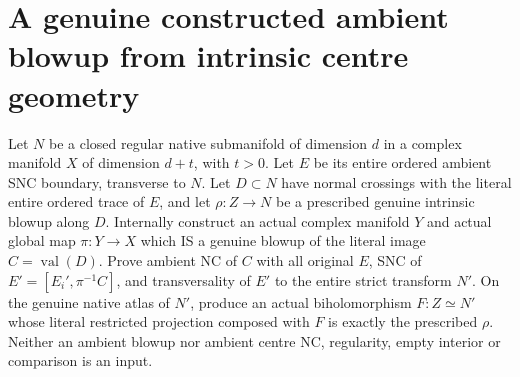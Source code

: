 \section{A genuine constructed ambient blowup from intrinsic centre geometry}

\begin{theorem}
\label{hir:disjoint-constructed-ambient-boundary-lift}
\leanok
Let $N$ be a closed regular native submanifold of dimension $d$ in a complex
manifold $X$ of dimension $d+t$, with $t>0$. Let $E$ be its entire ordered
ambient SNC boundary, transverse to $N$. Let $D\subset N$ have normal
crossings with the literal entire ordered trace of $E$, and let
$\rho:Z\to N$ be a prescribed genuine intrinsic blowup along $D$.
Internally construct an actual complex manifold $Y$ and actual global map
$\pi:Y\to X$ which IS a genuine blowup of the literal image
$C=\operatorname{val}(D)$. Prove ambient NC of $C$ with all original $E$,
SNC of $E'=[E_i',\pi^{-1}C]$, and transversality of $E'$ to the entire strict
transform $N'$. On the genuine native atlas of $N'$, produce an actual
biholomorphism $F:Z\simeq N'$ whose literal restricted projection composed
with $F$ is exactly the prescribed $\rho$. Neither an ambient blowup nor
ambient centre NC, regularity, empty interior or comparison is an input.
\end{theorem}
